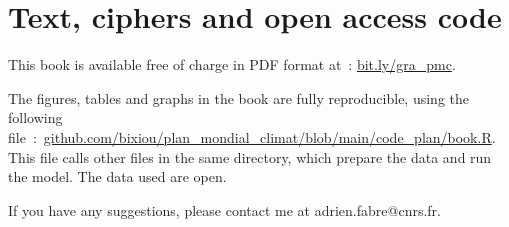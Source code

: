 \documentclass[a5paper,french,openany]{memoir}
\begin{document}
\section{Text, ciphers and open access code}

This book is available free of charge in PDF format at~: \href{https://global-redistribution-advocates.org/fr/un-plan-mondial-pour-le-climat-et-contre-lextreme-pauvrete/}{bit.ly/gra\_pmc}. %

The figures, tables and graphs in the book are fully reproducible, using the following file~:\ \href{https://github.com/bixiou/plan_mondial_climat/blob/main/code_plan/book.R}{github.com/bixiou/plan\_mondial\_climat/blob/main/code\_plan/book.R}. This file calls other files in the same directory, which prepare the data and run the model. The data used are open.

If you have any suggestions, please contact me at adrien.fabre@cnrs.fr.

\renewcommand{\url}[1]{\href{#1}{Lien}} %
{\small 

}

\clearpage
\end{document}
